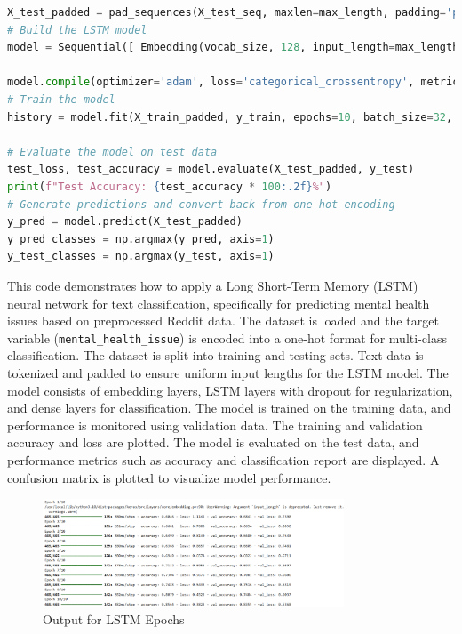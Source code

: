 \begin{tcolorbox}[colback=gray!5!white, colframe=gray!80!black, boxrule=0.5pt, title=LSTM Model Implementation]
    \begin{lstlisting}[language=Python]
X_test_padded = pad_sequences(X_test_seq, maxlen=max_length, padding='post', truncating='post')
# Build the LSTM model
model = Sequential([ Embedding(vocab_size, 128, input_length=max_length), LSTM(128,eturn_sequences=True), Dropout(0.2), LSTM(64), Dropout(0.2), Dense(64,activation='relu'), Dense(y.shape[1],activation='softmax')])

model.compile(optimizer='adam', loss='categorical_crossentropy', metrics=['accuracy'])
# Train the model
history = model.fit(X_train_padded, y_train, epochs=10, batch_size=32, validation_data=(X_test_padded, y_test))

# Evaluate the model on test data
test_loss, test_accuracy = model.evaluate(X_test_padded, y_test)
print(f"Test Accuracy: {test_accuracy * 100:.2f}%")
# Generate predictions and convert back from one-hot encoding
y_pred = model.predict(X_test_padded)
y_pred_classes = np.argmax(y_pred, axis=1)
y_test_classes = np.argmax(y_test, axis=1)
\end{lstlisting}
\end{tcolorbox}

\noindent
This code demonstrates how to apply a Long Short-Term Memory (LSTM) neural network for text classification, specifically for predicting mental health issues based on preprocessed Reddit data. The dataset is loaded and the target variable (\texttt{mental\_health\_issue}) is encoded into a one-hot format for multi-class classification. The dataset is split into training and testing sets. Text data is tokenized and padded to ensure uniform input lengths for the LSTM model. The model consists of embedding layers, LSTM layers with dropout for regularization, and dense layers for classification. The model is trained on the training data, and performance is monitored using validation data. The training and validation accuracy and loss are plotted. The model is evaluated on the test data, and performance metrics such as accuracy and classification report are displayed. A confusion matrix is plotted to visualize model performance.

\begin{figure}[h!]  
    \centering
    \includegraphics[width=0.8\textwidth]{Images/LSTM Epoch.png}  
    \caption{Output for LSTM Epochs}
    \label{LSTm Epochs}  %
\end{figure}

